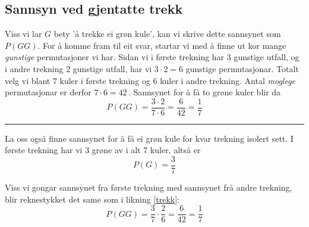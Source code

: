 \subsection{Sannsyn ved gjentatte trekk}
 \qquad
{}
Viss vi lar $ G $ bety 'å trekke ei grøn kule', kan vi skrive dette sannsynet som $ P(GG) $. For å komme fram til eit svar, startar vi med å finne ut kor mange \textsl{gunstige} permutasjoner vi har. Sidan vi i første trekning har 3 gunstige utfall, og i andre trekning 2 gunstige utfall, har vi $3\cdot2=6$ gunstige permutasjonar. Totalt velg vi blant 7 kuler i første trekning og 6 kuler i andre trekning. Antal \textsl{moglege} permutasjonar er derfor $7\cdot6=42$\,. Sannsynet for å få to grøne kuler blir da
\begin{equation}
P(GG)=\frac{3\cdot2}{7\cdot6}=\frac{6}{42}=\frac{1}{7} \label{trekk}
\end{equation}
\rule{\linewidth}{1pt}
La oss også finne sannsynet for å få ei grøn kule for kvar trekning isolert sett. I første trekning har vi 3 grøne av i alt 7 kuler, altså er
\[ P(G)=\frac{3}{7} \]
\qquad
{}


Viss vi gongar sannsynet fra første trekning med sannsynet frå andre trekning, blir reknestykket det same som i likning \eqref{trekk}:
\[ P(GG)=\frac{3}{7}\cdot\frac{2}{6}=\frac{6}{42}=\frac{1}{7} \]


